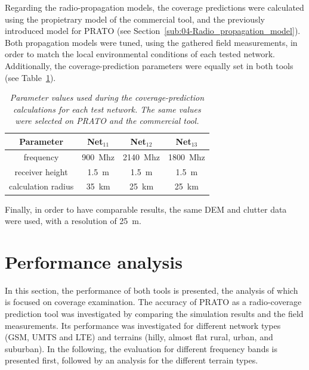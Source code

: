 Regarding the radio-propagation models, the coverage predictions were
calculated using the propietrary model of the commercial tool, and
the previously introduced model for PRATO (see Section~\ref{sub:04-Radio_propagation_model}).
Both propagation models were tuned, using the gathered field measurements,
in order to match the local environmental conditions of each tested
network. Additionally, the coverage-prediction parameters were equally
set in both tools (see Table~\ref{tab:08-Coverage_prediction_parameters}).

\begin{table}
\centering

\caption{\textit{\emph{Parameter values used during the coverage-prediction
calculations for each test network. The same values were selected
on PRATO and the commercial tool.\label{tab:08-Coverage_prediction_parameters}}}}


{\small{}}%
\begin{tabular}{cccc}
\toprule 
Parameter & Net$_{11}$ & Net$_{12}$ & Net$_{13}$\tabularnewline
\midrule 
frequency & {\small{900~Mhz}} & {\small{2140~Mhz}} & {\small{1800~Mhz}}\tabularnewline
receiver height & {\small{1.5~m}} & {\small{1.5~m}} & {\small{1.5~m}}\tabularnewline
calculation radius & {\small{35~km}} & {\small{25~km}} & {\small{25~km}}\tabularnewline
\bottomrule
\end{tabular}
\end{table}


Finally, in order to have comparable results, the same DEM and clutter
data were used, with a resolution of 25~m.


\section{Performance analysis \label{sec:08-Performance_analysis}}

In this section, the performance of both tools is presented, the analysis
of which is focused on coverage examination. The accuracy of PRATO
as a radio-coverage prediction tool was investigated by comparing
the simulation results and the field measurements. Its performance
was investigated for different network types (GSM, UMTS and LTE) and
terrains (hilly, almost flat rural, urban, and suburban). In the following,
the evaluation for different frequency bands is presented first, followed
by an analysis for the different terrain types.

